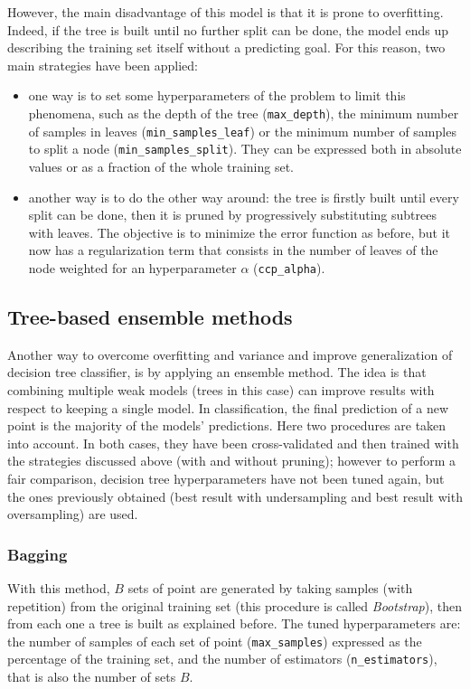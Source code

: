 \documentclass[letterpaper]{article}
\begin{document}
	However, the main disadvantage of this model is that it is prone to overfitting. Indeed, if the tree is built until no further split can be done, the model ends up describing the training set itself without a predicting goal. For this reason, two main strategies have been applied:
	\begin{itemize}
		\item one way is to set some hyperparameters of the problem to limit this phenomena, such as the depth of the tree (\texttt{max\_depth}), the minimum number of samples in leaves (\texttt{min\_samples\_leaf}) or the minimum number of samples to split a node (\texttt{min\_samples\_split}). They can be expressed both in absolute values or as a fraction of the whole training set.
		\item another way is to do the other way around: the tree is firstly built until every split can be done, then it is pruned by progressively substituting subtrees with leaves. The objective is to minimize the error function as before, but it now has a regularization term that consists in the number of leaves of the node weighted for an hyperparameter $\alpha$ (\texttt{ccp\_alpha}).
	\end{itemize}
	
	\subsection{Tree-based ensemble methods}
	Another way to overcome overfitting and variance and improve generalization of decision tree classifier, is by applying an ensemble method. The idea is that combining multiple weak models (trees in this case) can improve results with respect to keeping a single model. In classification, the final prediction of a new point is the majority of the models' predictions. Here two procedures are taken into account. In both cases, they have been cross-validated and then trained with the strategies discussed above (with and without pruning); however to perform a fair comparison, decision tree hyperparameters have not been tuned again, but the ones previously obtained (best result with undersampling and best result with oversampling) are used.
	\subsubsection{Bagging}
	With this method, $B$ sets of point are generated by taking samples (with repetition) from the original training set (this procedure is called \emph{Bootstrap}), then from each one a tree is built as explained before. The tuned hyperparameters are: the number of samples of each set of point (\texttt{max\_samples}) expressed as the percentage of the training set, and the number of estimators (\texttt{n\_estimators}), that is also the number of sets $B$.
\end{document}
